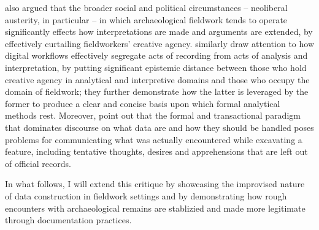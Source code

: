 \textcite[]{thorpe2012} also argued that the broader social and political circumstances -- neoliberal austerity, in particular -- in which archaeological fieldwork tends to operate significantly effects how interpretations are made and arguments are extended, by effectively curtailing fieldworkers' creative agency.
\textcites[]{huggett2022}[]{caraher2019}[]{batist2021}[]{batist-alienation} similarly draw attention to how digital workflows effectively segregate acts of recording from acts of analysis and interpretation, by putting significant epistemic distance between those who hold creative agency in analytical and interpretive domains and those who occupy the domain of fieldwork; they further demonstrate how the latter is leveraged by the former to produce a clear and concise basis upon which formal analytical methods rest.
Moreover, \textcites[]{batist2024a}[]{haciguzeller2021} point out that the formal and transactional paradigm that dominates discourse on what data are and how they should be handled poses problems for communicating what was actually encountered while excavating a feature, including tentative thoughts, desires and apprehensions that are left out of official records.

In what follows, I will extend this critique by showcasing the improvised nature of data construction in fieldwork settings and by demonstrating how rough encounters with archaeological remains are stablizied and made more legitimate through documentation practices.

